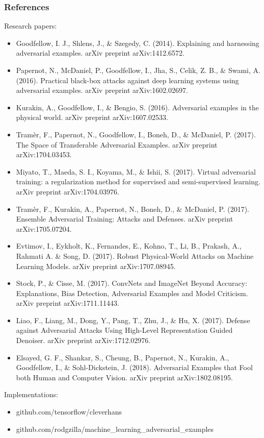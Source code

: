 \documentclass[9pt]{beamer}
\begin{document}
\begin{frame}
  \frametitle{References}

  Research papers:
  {\footnotesize
    \begin{itemize}
    \item Goodfellow, I. J., Shlens, J., \& Szegedy,
      C. (2014). Explaining and harnessing adversarial
      examples. arXiv preprint arXiv:1412.6572.
    \item Papernot, N., McDaniel, P., Goodfellow, I., Jha, S., Celik,
      Z. B., \& Swami, A. (2016). Practical black-box attacks against
      deep learning systems using adversarial examples. arXiv preprint
      arXiv:1602.02697.
    \item Kurakin, A., Goodfellow, I., \& Bengio,
      S. (2016). Adversarial examples in the physical world. arXiv
      preprint arXiv:1607.02533.
    \item Tramèr, F., Papernot, N., Goodfellow, I., Boneh, D., \&
      McDaniel, P. (2017). The Space of Transferable Adversarial
      Examples. arXiv preprint arXiv:1704.03453.
    \item Miyato, T., Maeda, S. I., Koyama, M., \& Ishii,
      S. (2017). Virtual adversarial training: a regularization method
      for supervised and semi-supervised learning. arXiv preprint
      arXiv:1704.03976.
    \item Tramèr, F., Kurakin, A., Papernot, N., Boneh, D., \&
      McDaniel, P. (2017). Ensemble Adversarial Training: Attacks and
      Defenses. arXiv preprint arXiv:1705.07204.
    \item Evtimov, I., Eykholt, K., Fernandes, E., Kohno, T., Li, B.,
      Prakash, A., Rahmati A. \& Song, D. (2017). Robust Physical-World
      Attacks on Machine Learning Models. arXiv preprint
      arXiv:1707.08945.
    \item Stock, P., \& Cisse, M. (2017). ConvNets and ImageNet Beyond
      Accuracy: Explanations, Bias Detection, Adversarial Examples and
      Model Criticism. arXiv preprint arXiv:1711.11443.
    \item Liao, F., Liang, M., Dong, Y., Pang, T., Zhu, J., \& Hu,
      X. (2017). Defense against Adversarial Attacks Using High-Level
      Representation Guided Denoiser. arXiv preprint arXiv:1712.02976.
    \item Elsayed, G. F., Shankar, S., Cheung, B., Papernot, N.,
      Kurakin, A., Goodfellow, I., \& Sohl-Dickstein,
      J. (2018). Adversarial Examples that Fool both Human and
      Computer Vision. arXiv preprint arXiv:1802.08195.
    \end{itemize}
  }

  \medskip

  Implementations:
  \begin{itemize}
    \item github.com/tensorflow/cleverhans
    \item github.com/rodgzilla/machine\_learning\_adversarial\_examples
  \end{itemize}

\end{frame}
\end{document}
